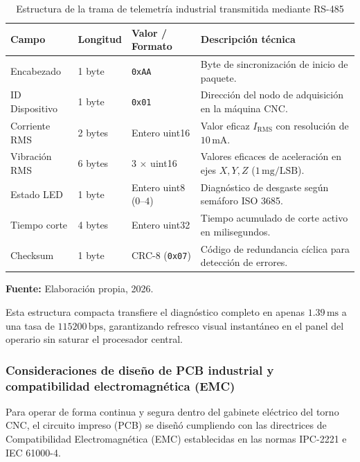 \begin{table}[H]
\centering
\caption{Estructura de la trama de telemetría industrial transmitida mediante RS-485}\label{tab:estructura_trama_rs485}
\vspace{2mm}
\small
\begin{tabular}{|p{2.0cm}|p{2.2cm}|p{2.6cm}|p{6.4cm}|}
\hline
\textbf{Campo} & \textbf{Longitud} & \textbf{Valor / Formato} & \textbf{Descripción técnica} \\ \hline \hline
Encabezado & 1 byte & \texttt{0xAA} & Byte de sincronización de inicio de paquete. \\ \hline
ID Dispositivo & 1 byte & \texttt{0x01} & Dirección del nodo de adquisición en la máquina CNC. \\ \hline
Corriente RMS & 2 bytes & Entero uint16 & Valor eficaz $I_{\text{RMS}}$ con resolución de $10\,\text{mA}$. \\ \hline
Vibración RMS & 6 bytes & 3 $\times$ uint16 & Valores eficaces de aceleración en ejes $X, Y, Z$ ($1\,\text{mg/LSB}$). \\ \hline
Estado LED & 1 byte & Entero uint8 ($0\text{--}4$) & Diagnóstico de desgaste según semáforo ISO 3685. \\ \hline
Tiempo corte & 4 bytes & Entero uint32 & Tiempo acumulado de corte activo en milisegundos. \\ \hline
Checksum & 1 byte & CRC-8 (\texttt{0x07}) & Código de redundancia cíclica para detección de errores. \\ \hline
\end{tabular}
\par\vspace{2mm}
\footnotesize \textbf{Fuente:} Elaboración propia, 2026.
\end{table}

Esta estructura compacta transfiere el diagnóstico completo en apenas $1.39\,\text{ms}$ a una tasa de $115200\,\text{bps}$, garantizando refresco visual instantáneo en el panel del operario sin saturar el procesador central.

\subsubsection{Consideraciones de diseño de PCB industrial y compatibilidad electromagnética (EMC)}

Para operar de forma continua y segura dentro del gabinete eléctrico del torno CNC, el circuito impreso (PCB) se diseñó cumpliendo con las directrices de Compatibilidad Electromagnética (EMC) establecidas en las normas IPC-2221 e IEC 61000-4.

